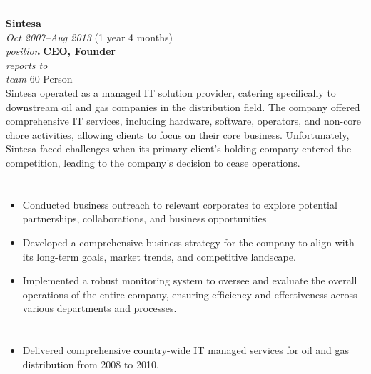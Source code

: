 \documentclass[12pt]{res}
\begin{document}
\begin{resume}
\vspace{10pt}
\rule{1.0\textwidth}{0.1pt}

\begin{multicols}{2}
	{\large {\bf \href{https://sintesatama.co.id}{Sintesa}}} \\
	{\footnotesize{\sl Oct 2007--Aug 2013} \hfill (1 year 4 months)}\\
	{\footnotesize{\sl position} \hfill \bf{CEO, Founder}}\\
	{\footnotesize{\sl reports to} \hfill }\\
	{\footnotesize{\sl team} \hfill 60 Person}\\

	\columnbreak
	{\footnotesize{Sintesa operated as a managed IT solution provider, catering specifically to downstream oil and gas companies in the distribution field. The company offered comprehensive IT services, including hardware, software, operators, and non-core chore activities, allowing clients to focus on their core business. Unfortunately, Sintesa faced challenges when its primary client's holding company entered the competition, leading to the company's decision to cease operations.}}\\
\end{multicols}
\vspace{-20pt}

\begin{multicols}{2}
	\section{}
		\begin{itemize}
			\item Conducted business outreach to relevant corporates to explore potential partnerships, collaborations, and business opportunities

\item Developed a comprehensive business strategy for the company to align with its long-term goals, market trends, and competitive landscape.

\item Implemented a robust monitoring system to oversee and evaluate the overall operations of the entire company, ensuring efficiency and effectiveness across various departments and processes.
		\end{itemize}
	\section{}
		\begin{itemize}
			\setlength{\itemindent}{0pt}
			\item Delivered comprehensive country-wide IT managed services for oil and gas distribution from 2008 to 2010.


\end{itemize}
\end{multicols}
\end{resume}
\end{document}
